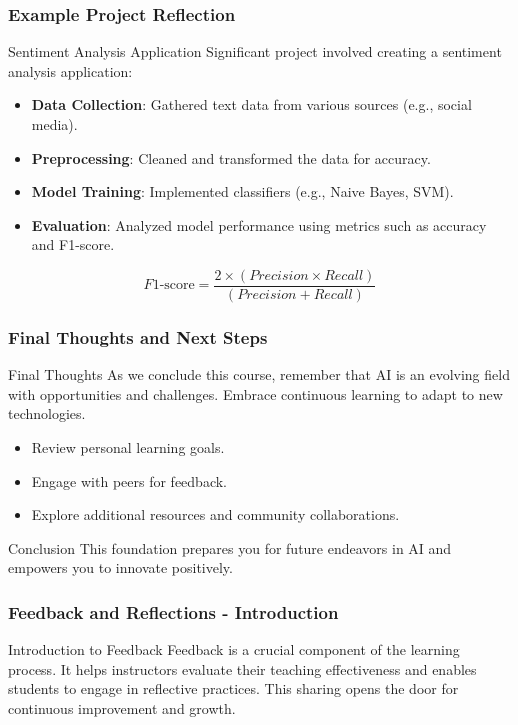 \documentclass[aspectratio=169]{beamer}
\begin{document}
\begin{frame}[fragile]
    \frametitle{Example Project Reflection}
    \begin{block}{Sentiment Analysis Application}
        Significant project involved creating a sentiment analysis application:
        \begin{itemize}
            \item \textbf{Data Collection}: Gathered text data from various sources (e.g., social media).
            \item \textbf{Preprocessing}: Cleaned and transformed the data for accuracy.
            \item \textbf{Model Training}: Implemented classifiers (e.g., Naive Bayes, SVM).
            \item \textbf{Evaluation}: Analyzed model performance using metrics such as accuracy and F1-score.
        \end{itemize}
    \end{block}
    \begin{equation}
        F1\text{-score} = \frac{2 \times (Precision \times Recall)}{(Precision + Recall)}
    \end{equation}
\end{frame}

\begin{frame}[fragile]
    \frametitle{Final Thoughts and Next Steps}
    \begin{block}{Final Thoughts}
        As we conclude this course, remember that AI is an evolving field with opportunities and challenges. 
        Embrace continuous learning to adapt to new technologies.
    \end{block}
    \begin{itemize}
        \item Review personal learning goals.
        \item Engage with peers for feedback.
        \item Explore additional resources and community collaborations.
    \end{itemize}
    \begin{block}{Conclusion}
        This foundation prepares you for future endeavors in AI and empowers you to innovate positively.
    \end{block}
\end{frame}

\begin{frame}[fragile]
    \frametitle{Feedback and Reflections - Introduction}
    \begin{block}{Introduction to Feedback}
        Feedback is a crucial component of the learning process. It helps instructors evaluate their teaching effectiveness and enables students to engage in reflective practices. This sharing opens the door for continuous improvement and growth.
    \end{block}
\end{frame}
\end{document}
